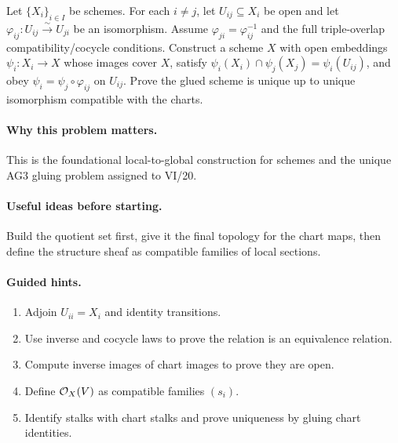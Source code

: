 \begin{problem}\label{prob:vi20-p01}
Let $\{X_i\}_{i\in I}$ be schemes.  For each $i\ne j$, let $U_{ij}\subseteq X_i$ be open and let
$\varphi_{ij}:U_{ij}\xrightarrow{\sim}U_{ji}$ be an isomorphism.  Assume
$\varphi_{ji}=\varphi_{ij}^{-1}$ and the full triple-overlap compatibility/cocycle conditions.
Construct a scheme $X$ with open embeddings $\psi_i:X_i\to X$ whose images cover $X$, satisfy
$\psi_i(X_i)\cap\psi_j(X_j)=\psi_i(U_{ij})$, and obey $\psi_i=\psi_j\circ\varphi_{ij}$ on $U_{ij}$.
Prove the glued scheme is unique up to unique isomorphism compatible with the charts.
\end{problem}

\ifdefined\FullProblemDossiers
\paragraph{Why this problem matters.}
This is the foundational local-to-global construction for schemes and the unique AG3 gluing problem assigned to VI/20.

\paragraph{Useful ideas before starting.}
Build the quotient set first, give it the final topology for the chart maps, then define the structure sheaf as compatible families of local sections.

\paragraph{Guided hints.}
\begin{enumerate}
\item Adjoin $U_{ii}=X_i$ and identity transitions.
\item Use inverse and cocycle laws to prove the relation is an equivalence relation.
\item Compute inverse images of chart images to prove they are open.
\item Define $\mathcal O_X(V)$ as compatible families $(s_i)$.
\item Identify stalks with chart stalks and prove uniqueness by gluing chart identities.
\end{enumerate}

